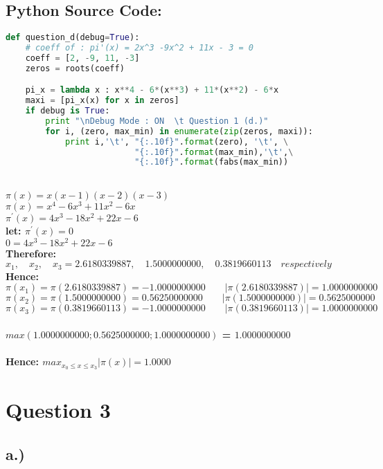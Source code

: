 \documentclass{article}
\begin{document}
\subsection*{Python Source Code:}
\begin{lstlisting}[language=Python]
def question_d(debug=True):
    # coeff of : pi'(x) = 2x^3 -9x^2 + 11x - 3 = 0
    coeff = [2, -9, 11, -3]
    zeros = roots(coeff)

    pi_x = lambda x : x**4 - 6*(x**3) + 11*(x**2) - 6*x
    maxi = [pi_x(x) for x in zeros]
    if debug is True:
        print "\nDebug Mode : ON  \t Question 1 (d.)"
        for i, (zero, max_min) in enumerate(zip(zeros, maxi)):
            print i,'\t', "{:.10f}".format(zero), '\t', \
                          "{:.10f}".format(max_min),'\t',\
                          "{:.10f}".format(fabs(max_min))
\end{lstlisting}
\textbf{  \\  }
\textbf{$\pi(x) = x(x - 1)(x - 2)(x - 3)$\\
$\pi(x) = x^4 - 6x^3 + 11x^2 - 6x $\\
$\pi^' (x) = 4x^3 - 18x^2 + 22x - 6 $\\
let: $\pi^' (x) = 0$ \\
$ 0 = 4x^3 - 18x^2 + 22x - 6$\\
Therefore:\\
$x_1, \quad x_2, \quad x_3 = 2.6180339887,\quad 1.5000000000,\quad 0.3819660113 \quad respectively$ \\
Hence: \\
$\pi(x_1) = \pi(2.6180339887) = -1.0000000000  \quad\quad|\pi(2.6180339887)| = 1.0000000000$\\
$\pi(x_2) = \pi(1.5000000000) = 0.56250000000 \quad\quad|\pi(1.5000000000)| = 0.5625000000$ \\
$\pi(x_3) = \pi(0.3819660113) = -1.0000000000  \quad\quad|\pi(0.3819660113)| = 1.0000000000$\\\\
$max(1.0000000000; 0.5625000000; 1.0000000000)$ = $1.0000000000$\\\\
Hence: $ max_{x_0 \leq x \leq x_3} |\pi(x)| = 1.0000$ 
}
\pagebreak



\section*{Question 3}
\subsection*{a.)}
\end{document}
